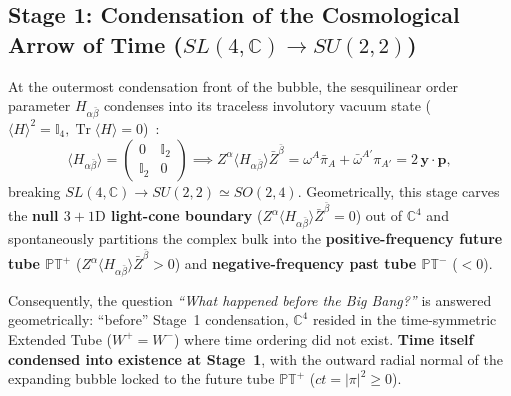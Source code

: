 \documentclass[11pt,a4paper]{article}
\begin{document}
\subsection{Stage 1: Condensation of the Cosmological Arrow of Time (\texorpdfstring{$SL(4,\mathbb{C}) \to SU(2,2)$}{SL(4,C) to SU(2,2)})}
At the outermost condensation front of the bubble, the sesquilinear order parameter $H_{\alpha\bar{\beta}}$ condenses into its traceless involutory vacuum state ($\langle H\rangle^2 = \mathbb{I}_4, \operatorname{Tr}\langle H\rangle = 0$)~\cite{Penrose1967,PenroseRindler1984}:
\begin{equation}
\langle H_{\alpha\bar{\beta}} \rangle = \begin{pmatrix} 0 & \mathbb{I}_2 \\ \mathbb{I}_2 & 0 \end{pmatrix} \implies Z^\alpha \langle H_{\alpha\bar{\beta}} \rangle \bar{Z}^{\bar{\beta}} = \omega^A \bar{\pi}_A + \bar{\omega}^{A'}\pi_{A'} = 2\, \mathbf{y} \cdot \mathbf{p},
\end{equation}
breaking $SL(4,\mathbb{C}) \to SU(2,2) \simeq SO(2,4)$. Geometrically, this stage carves the \textbf{null $3+1\text{D}$ light-cone boundary} ($Z^\alpha \langle H_{\alpha\bar{\beta}}\rangle \bar{Z}^{\bar{\beta}} = 0$) out of $\mathbb{C}^4$ and spontaneously partitions the complex bulk into the \textbf{positive-frequency future tube $\mathbb{PT}^+$} ($Z^\alpha \langle H_{\alpha\bar{\beta}}\rangle \bar{Z}^{\bar{\beta}} > 0$) and \textbf{negative-frequency past tube $\mathbb{PT}^-$} ($< 0$).

Consequently, the question \emph{``What happened before the Big Bang?''} is answered geometrically: ``before'' Stage~1 condensation, $\mathbb{C}^4$ resided in the time-symmetric Extended Tube ($W^+ = W^-$) where time ordering did not exist. \textbf{Time itself condensed into existence at Stage~1}, with the outward radial normal of the expanding bubble locked to the future tube $\mathbb{PT}^+$ ($ct = |\pi|^2 \ge 0$).
\end{document}
